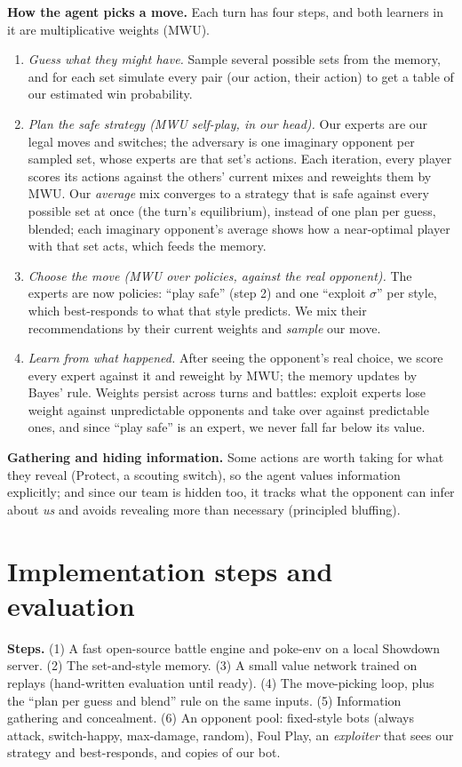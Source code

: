 \documentclass[10pt]{article}
\begin{document}
\textbf{How the agent picks a move.} Each turn has four steps, and both learners in it are multiplicative weights (MWU).
\begin{enumerate}[label=(\arabic*),leftmargin=1.4em]
\item \emph{Guess what they might have.} Sample several possible sets from the memory, and for each set simulate every pair (our action, their action) to get a table of our estimated win probability.
\item \emph{Plan the safe strategy (MWU self-play, in our head).} Our experts are our legal moves and switches; the adversary is one imaginary opponent per sampled set, whose experts are that set's actions. Each iteration, every player scores its actions against the others' current mixes and reweights them by MWU. Our \emph{average} mix converges to a strategy that is safe against every possible set at once (the turn's equilibrium), instead of one plan per guess, blended; each imaginary opponent's average shows how a near-optimal player with that set acts, which feeds the memory.
\item \emph{Choose the move (MWU over policies, against the real opponent).} The experts are now policies: ``play safe'' (step 2) and one ``exploit $\sigma$'' per style, which best-responds to what that style predicts. We mix their recommendations by their current weights and \emph{sample} our move.
\item \emph{Learn from what happened.} After seeing the opponent's real choice, we score every expert against it and reweight by MWU; the memory updates by Bayes' rule. Weights persist across turns and battles: exploit experts lose weight against unpredictable opponents and take over against predictable ones, and since ``play safe'' is an expert, we never fall far below its value.
\end{enumerate}

\textbf{Gathering and hiding information.} Some actions are worth taking for what they reveal (Protect, a scouting switch), so the agent values information explicitly; and since our team is hidden too, it tracks what the opponent can infer about \emph{us} and avoids revealing more than necessary (principled bluffing).

\section{Implementation steps and evaluation}
\textbf{Steps.} (1) A fast open-source battle engine and poke-env on a local Showdown server. (2) The set-and-style memory. (3) A small value network trained on replays (hand-written evaluation until ready). (4) The move-picking loop, plus the ``plan per guess and blend'' rule on the same inputs. (5) Information gathering and concealment. (6) An opponent pool: fixed-style bots (always attack, switch-happy, max-damage, random), Foul Play, an \emph{exploiter} that sees our strategy and best-responds, and copies of our bot.
\end{document}
